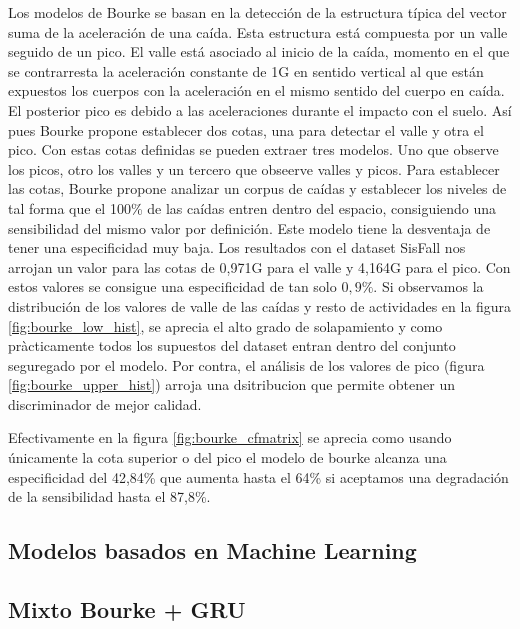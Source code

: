 \documentclass[../tfm.tex]{subfiles}
\begin{document}
Los modelos de Bourke \cite{Bourke2006} se basan en la detección de la estructura típica del vector suma de la aceleración de una caída. Esta estructura está compuesta por un valle seguido de un pico. El valle está asociado al inicio de la caída, momento en el que se contrarresta la aceleración constante de 1G en sentido vertical al que están expuestos los cuerpos con la aceleración en el mismo sentido del cuerpo en caída. El posterior pico es debido a las aceleraciones durante el impacto con el suelo. Así pues Bourke propone establecer dos cotas, una para detectar el valle y otra el pico. Con estas cotas definidas se pueden extraer tres modelos. Uno que observe los picos, otro los valles y un tercero que obseerve valles y picos.
Para establecer las cotas, Bourke propone analizar un corpus de caídas y establecer los niveles de tal forma que el 100\% de las caídas entren dentro del espacio, consiguiendo una sensibilidad del mismo valor por definición. Este modelo tiene la desventaja de tener una especificidad muy baja. Los resultados con el dataset SisFall nos arrojan un valor para las cotas de 0,971G para el valle y 4,164G para el pico. Con estos valores se consigue una especificidad de tan solo $0,9\%$. Si observamos la distribución de los valores de valle de las caídas y resto de actividades en la figura \ref{fig:bourke_low_hist}, se aprecia el alto grado de solapamiento y como pràcticamente todos los supuestos del dataset entran dentro del conjunto seguregado por el modelo. Por contra, el análisis de los valores de pico (figura \ref{fig:bourke_upper_hist}) arroja una dsitribucion que permite obtener un discriminador de mejor calidad.

Efectivamente en la figura \ref{fig:bourke_cfmatrix} se aprecia como usando únicamente la cota superior o del pico el modelo de bourke alcanza una especificidad del 42,84\% que aumenta hasta el 64\% si aceptamos una degradación de la sensibilidad hasta el 87,8\%.



\subsection{Modelos basados en Machine Learning}

\subsection{Mixto Bourke + GRU}
\end{document}
